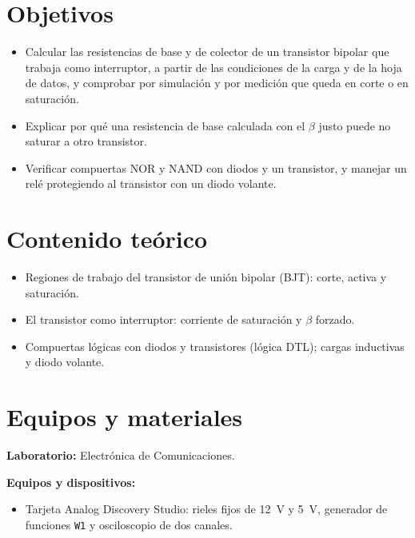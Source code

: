 \documentclass[11pt,a4paper]{article}
\begin{document}
\section{Objetivos}
\begin{itemize}
    \item Calcular las resistencias de base y de colector de un transistor bipolar que trabaja
          como interruptor, a partir de las condiciones de la carga y de la hoja de datos, y
          comprobar por simulación y por medición que queda en corte o en saturación.
    \item Explicar por qué una resistencia de base calculada con el $\beta$ justo puede no
          saturar a otro transistor.
    \item Verificar compuertas NOR y NAND con diodos y un transistor, y manejar un relé
          protegiendo al transistor con un diodo volante.
\end{itemize}

\section{Contenido teórico}
\begin{itemize}
    \item Regiones de trabajo del transistor de unión bipolar (BJT): corte, activa y
          saturación.
    \item El transistor como interruptor: corriente de saturación y $\beta$ forzado.
    \item Compuertas lógicas con diodos y transistores (lógica DTL); cargas inductivas y
          diodo volante.
\end{itemize}

\section{Equipos y materiales}
\noindent\textbf{Laboratorio:} Electrónica de Comunicaciones.

\vspace{0.25cm}
\noindent\textbf{Equipos y dispositivos:}
\begin{itemize}
    \item Tarjeta Analog Discovery Studio: rieles fijos de \qty{+12}{\volt} y
          \qty{+5}{\volt}, generador de funciones \texttt{W1} y osciloscopio de dos canales.
\end{itemize}
\end{document}
